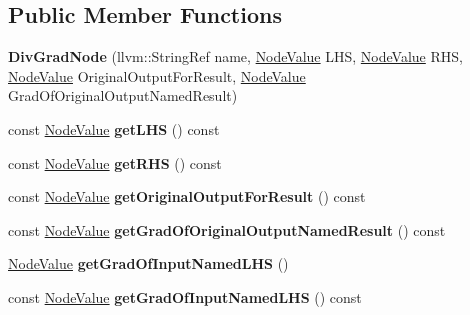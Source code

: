 \subsection*{Public Member Functions}
\begin{DoxyCompactItemize}
\item 
\mbox{\label{classglow_1_1_div_grad_node_a852d8388359f08f791c2c097e5854b43}} 
{\bfseries Div\+Grad\+Node} (llvm\+::\+String\+Ref name, \hyperlink{structglow_1_1_node_value}{Node\+Value} L\+HS, \hyperlink{structglow_1_1_node_value}{Node\+Value} R\+HS, \hyperlink{structglow_1_1_node_value}{Node\+Value} Original\+Output\+For\+Result, \hyperlink{structglow_1_1_node_value}{Node\+Value} Grad\+Of\+Original\+Output\+Named\+Result)
\item 
\mbox{\label{classglow_1_1_div_grad_node_ae905503cf6fa0b4c2d1bb45eeec82dbc}} 
const \hyperlink{structglow_1_1_node_value}{Node\+Value} {\bfseries get\+L\+HS} () const
\item 
\mbox{\label{classglow_1_1_div_grad_node_ad1bdbb7d8d04bc8440b7c6ecd4091319}} 
const \hyperlink{structglow_1_1_node_value}{Node\+Value} {\bfseries get\+R\+HS} () const
\item 
\mbox{\label{classglow_1_1_div_grad_node_a1f380cc9a7dbd077942a12a9f0a68c82}} 
const \hyperlink{structglow_1_1_node_value}{Node\+Value} {\bfseries get\+Original\+Output\+For\+Result} () const
\item 
\mbox{\label{classglow_1_1_div_grad_node_a895c69eae6ce51f072233b6238e4493c}} 
const \hyperlink{structglow_1_1_node_value}{Node\+Value} {\bfseries get\+Grad\+Of\+Original\+Output\+Named\+Result} () const
\item 
\mbox{\label{classglow_1_1_div_grad_node_ab7f0585ddb4c3fb795e6633eb2256ea9}} 
\hyperlink{structglow_1_1_node_value}{Node\+Value} {\bfseries get\+Grad\+Of\+Input\+Named\+L\+HS} ()
\item 
\mbox{\label{classglow_1_1_div_grad_node_ad0f77afc9065aefb21546942effbd2a6}} 
const \hyperlink{structglow_1_1_node_value}{Node\+Value} {\bfseries get\+Grad\+Of\+Input\+Named\+L\+HS} () const

\end{DoxyCompactItemize}
